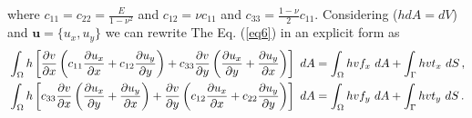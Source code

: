 \documentclass[]{article}
\begin{document}
where $c_{11}=c_{22}=\frac{E}{1-\nu^2}$ and $c_{12}=\nu c_{11}$ and $c_{33} = \frac{1-\nu}{2}c_{11}$.  Considering ($hdA=dV$)  and $\mathbf{u} = \{u_x, u_y\}$ we can rewrite The Eq. (\ref{eq6}) in an explicit form as \cite{reddy2005introduction}
\begin{equation}\label{eq10}
	\begin{aligned}[b]
		&\int_{\Omega} h \left[\frac{\partial v}{\partial x}\left(c_{11}\frac{\partial u_x}{\partial x} + c_{12}\frac{\partial u_y}{\partial y} \right) + c_{33}\frac{\partial v}{\partial y}\left(\frac{\partial u_x}{\partial y} + \frac{\partial u_y}{\partial x} \right)\right]  \ dA = 	\int_{\Omega} h v f_x \ dA + \int_{\Gamma} h v t_x \ dS \thinspace,\\
		&\int_{\Omega} h \left[c_{33}\frac{\partial v}{\partial x}\left(\frac{\partial u_x}{\partial y} + \frac{\partial u_y}{\partial x} \right) + \frac{\partial v}{\partial y}\left(c_{12}\frac{\partial u_x}{\partial x} + c_{22}\frac{\partial u_y}{\partial y} \right)\right]  \ dA = 	\int_{\Omega} h v f_y \ dA +\int_{\Gamma} h v t_y \ dS\thinspace.
	\end{aligned}
\end{equation}
\end{document}
